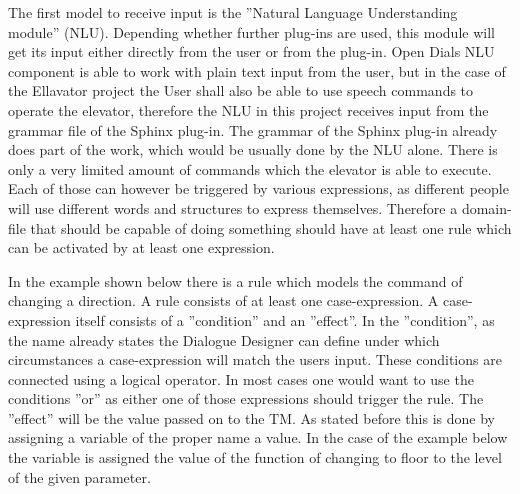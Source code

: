 The first model to receive input is the ”Natural Language Understanding module” (NLU). 
Depending whether further plug-ins are used, this module will get its input either directly from the user or from the plug-in.
Open Dials NLU component is able to work with plain text input from the user, but in the case of the Ellavator project the User shall also be able to use speech commands to operate the elevator, therefore the NLU in this project receives input from the grammar file of the Sphinx plug-in.
The grammar of the Sphinx plug-in already does part of the work, which would be usually done by the NLU alone.
There is only a very limited amount of commands which the elevator is able to execute.
Each of those can however be triggered by various expressions, as different people will use different words and structures to express themselves.
Therefore a domain-file that should be capable of doing something should have at least one rule which can be activated by at least one expression. \newline

In the example shown below there is a rule which models the command of changing a direction.
A rule consists of at least one case-expression.
A case-expression itself consists of a ”condition” and an ”effect”.
 In the ”condition”, as the name already states the Dialogue Designer can define under which circumstances a case-expression will match the users input.
These conditions are connected using a logical operator.
In most cases one would want to use the conditions ”or” as either one of those expressions should trigger the rule.
 The ”effect” will be the value passed on to the TM.
As stated before this is done by assigning a variable of the proper name a value.
In the case of the example below the variable is assigned the value of the function of changing to floor to the level of the given parameter. 
\newline


